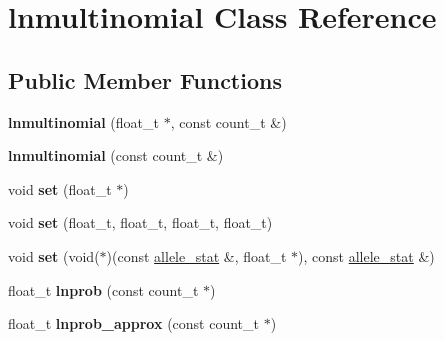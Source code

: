 \hypertarget{classlnmultinomial}{\section{lnmultinomial Class Reference}
\label{classlnmultinomial}
}
\subsection*{Public Member Functions}
\begin{DoxyCompactItemize}
\item 
\hypertarget{classlnmultinomial_a338ae23db2aed67713045e130622badc}{{\bfseries lnmultinomial} (float\-\_\-t $\ast$, const count\-\_\-t \&)}\label{classlnmultinomial_a338ae23db2aed67713045e130622badc}

\item 
\hypertarget{classlnmultinomial_a0918e1067d0d8bb764c49958dbc41ce8}{{\bfseries lnmultinomial} (const count\-\_\-t \&)}\label{classlnmultinomial_a0918e1067d0d8bb764c49958dbc41ce8}

\item 
\hypertarget{classlnmultinomial_a91dd77fd2c1ff0dd847727a0fe839e4b}{void {\bfseries set} (float\-\_\-t $\ast$)}\label{classlnmultinomial_a91dd77fd2c1ff0dd847727a0fe839e4b}

\item 
\hypertarget{classlnmultinomial_abc759e365df6d8daca003e5ecfdfca5c}{void {\bfseries set} (float\-\_\-t, float\-\_\-t, float\-\_\-t, float\-\_\-t)}\label{classlnmultinomial_abc759e365df6d8daca003e5ecfdfca5c}

\item 
\hypertarget{classlnmultinomial_a7532f39e8449f39a6b317b8b0cd28e4f}{void {\bfseries set} (void($\ast$)(const \hyperlink{classallele__stat}{allele\-\_\-stat} \&, float\-\_\-t $\ast$), const \hyperlink{classallele__stat}{allele\-\_\-stat} \&)}\label{classlnmultinomial_a7532f39e8449f39a6b317b8b0cd28e4f}

\item 
\hypertarget{classlnmultinomial_a97f19c05ef64d56f1f41cffb78058b9d}{float\-\_\-t {\bfseries lnprob} (const count\-\_\-t $\ast$)}\label{classlnmultinomial_a97f19c05ef64d56f1f41cffb78058b9d}

\item 
\hypertarget{classlnmultinomial_af5a14d8dec973b79711a55a3a747b59e}{float\-\_\-t {\bfseries lnprob\-\_\-approx} (const count\-\_\-t $\ast$)}\label{classlnmultinomial_af5a14d8dec973b79711a55a3a747b59e}


\end{DoxyCompactItemize}
